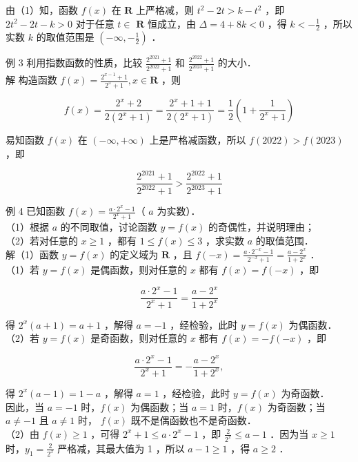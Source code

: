 \documentclass[10pt]{article}
\begin{document}
由（1）知，函数 \(f(x)\) 在 \(\mathbf{R}\) 上严格减，则 \(t^{2}-2 t>k-t^{2}\) ，即 \(2 t^{2}-2 t-k>0\) 对于任意 \(t \in\) \(\mathbf{R}\) 恒成立，由 \(\Delta=4+8 k<0\) ，得 \(k<-\frac{1}{2}\) ，所以实数 \(k\) 的取值范围是 \(\left(-\infty,-\frac{1}{2}\right)\) ．

例 3 利用指数函数的性质，比较 \(\frac{2^{2021}+1}{2^{2022}+1}\) 和 \(\frac{2^{2022}+1}{2^{2023}+1}\) 的大小．\\
解 构造函数 \(f(x)=\frac{2^{x-1}+1}{2^{x}+1}, x \in \mathbf{R}\) ，则

\[
f(x)=\frac{2^{x}+2}{2\left(2^{x}+1\right)}=\frac{2^{x}+1+1}{2\left(2^{x}+1\right)}=\frac{1}{2}\left(1+\frac{1}{2^{x}+1}\right)
\]

易知函数 \(f(x)\) 在 \((-\infty,+\infty)\) 上是严格减函数，所以 \(f(2022)>f(2023)\) ，即

\[
\frac{2^{2021}+1}{2^{2022}+1}>\frac{2^{2022}+1}{2^{2023}+1}
\]

例 4 已知函数 \(f(x)=\frac{a \cdot 2^{x}-1}{2^{x}+1}\)（ \(a\) 为实数）．\\
（1）根据 \(a\) 的不同取值，讨论函数 \(y=f(x)\) 的奇偶性，并说明理由；\\
（2）若对任意的 \(x \geqslant 1\) ，都有 \(1 \leqslant f(x) \leqslant 3\) ，求实数 \(a\) 的取值范围．\\
解（1）函数 \(y=f(x)\) 的定义域为 \(\mathbf{R}\) ，且 \(f(-x)=\frac{a \cdot 2^{-x}-1}{2^{-x}+1}=\frac{a-2^{x}}{1+2^{x}}\) ．\\
（1）若 \(y=f(x)\) 是偶函数，则对任意的 \(x\) 都有 \(f(x)=f(-x)\) ，即

\[
\frac{a \cdot 2^{x}-1}{2^{x}+1}=\frac{a-2^{x}}{1+2^{x}}
\]

得 \(2^{x}(a+1)=a+1\) ，解得 \(a=-1\) ，经检验，此时 \(y=f(x)\) 为偶函数．\\
（2）若 \(y=f(x)\) 是奇函数，则对任意的 \(x\) 都有 \(f(x)=-f(-x)\) ，即

\[
\frac{a \cdot 2^{x}-1}{2^{x}+1}=-\frac{a-2^{x}}{1+2^{x}},
\]

得 \(2^{x}(a-1)=1-a\) ，解得 \(a=1\) ，经检验，此时 \(y=f(x)\) 为奇函数．\\
因此，当 \(a=-1\) 时，\(f(x)\) 为偶函数；当 \(a=1\) 时，\(f(x)\) 为奇函数；当 \(a \neq-1\) 且 \(a \neq 1\) 时， \(f(x)\) 既不是偶函数也不是奇函数．\\
（2）由 \(f(x) \geqslant 1\) ，可得 \(2^{x}+1 \leqslant a \cdot 2^{x}-1\) ，即 \(\frac{2}{2^{x}} \leqslant a-1\) ．因为当 \(x \geqslant 1\) 时，\(y_{1}=\frac{2}{2^{x}}\) 严格减，其最大值为 1 ，所以 \(a-1 \geqslant 1\) ，得 \(a \geqslant 2\) ．
\end{document}
